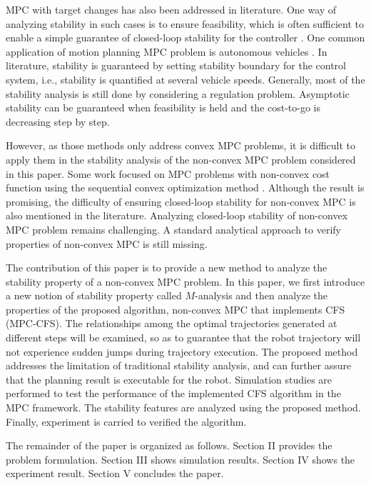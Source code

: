 MPC with target changes has also been addressed in literature. One way of analyzing stability in such cases is to ensure feasibility, which is often sufficient to enable a simple guarantee of closed-loop stability for the controller \cite{boccia2014stability}\cite{dughman2015survey}\cite{zhang2016switched}. One common application of motion planning MPC problem is autonomous vehicles \cite{borrelli2005mpc}. In literature, stability is guaranteed by setting stability boundary for the control system, i.e., stability is quantified at several vehicle speeds. Generally, most of the stability analysis is still done by considering a regulation problem. Asymptotic stability can be guaranteed when feasibility is held and the cost-to-go is decreasing step by step.

However, as those methods only address convex MPC problems, it is difficult to apply them in the stability analysis of the non-convex MPC problem considered in this paper. Some work focused on MPC problems with non-convex cost function using the sequential convex optimization method \cite{hovgaard2013nonconvex}. Although the result is promising, the difficulty of ensuring closed-loop stability for non-convex MPC is also mentioned in the literature. 
Analyzing closed-loop stability of non-convex MPC problem remains challenging. A standard analytical approach to verify properties of non-convex MPC is still missing.


The contribution of this paper is to provide a new method to analyze the stability property of a non-convex MPC problem. In this paper, we first introduce a new notion of stability property called $M$-analysis and then analyze the properties of the proposed algorithm,  non-convex MPC that implements CFS (MPC-CFS). The relationships among the optimal trajectories generated at different steps will be examined, so as to guarantee that the robot trajectory will not experience sudden jumps during trajectory execution. The proposed method addresses the limitation of traditional stability analysis, and can further assure that the planning result is executable for the robot. Simulation studies are performed to test the performance of the implemented CFS  algorithm in the MPC framework. The stability features are analyzed using the proposed method. Finally, experiment is carried to verified the algorithm.

The remainder of the paper is organized as follows. Section II provides the problem formulation. Section III shows simulation results. Section IV shows the experiment result. Section V concludes the paper.